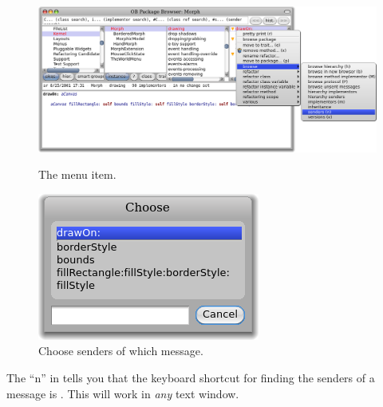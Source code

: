 \documentclass[a4paper,10pt,twoside]{book}
\begin{document}
\begin{figure}[htb]
\begin{minipage}[b]{0.74\textwidth}
\centerline {\includegraphics[width=\textwidth]{SendersOfDrawOn}}
\caption{The  menu item.}
\end{minipage}
\hfill
\begin{minipage}[b]{0.24\textwidth}
\centerline {\includegraphics[width=\textwidth]{SendersOfDrawOn2}}
\caption{Choose senders of which message.}
\end{minipage}
\end{figure}

The ``n'' in  tells you that the keyboard shortcut for finding the senders of a message is . This will work in \emph{any} text window.

\end{document}
